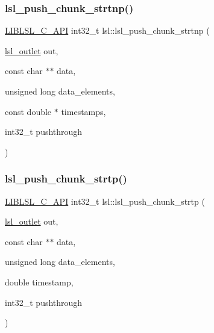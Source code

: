 \subsubsection{\texorpdfstring{lsl\+\_\+push\+\_\+chunk\+\_\+strtnp()}{lsl\_push\_chunk\_strtnp()}}
{\footnotesize\ttfamily \hyperlink{lsl__cpp_8h_aafd0ef1813e8be84a1420c4f1df64615}{L\+I\+B\+L\+S\+L\+\_\+\+C\+\_\+\+A\+PI} int32\+\_\+t lsl\+::lsl\+\_\+push\+\_\+chunk\+\_\+strtnp (\begin{DoxyParamCaption}\item[{\hyperlink{namespacelsl_abcf512b0f66dacf86c10b165995fd50b}{lsl\+\_\+outlet}}]{out,  }\item[{const char $\ast$$\ast$}]{data,  }\item[{unsigned long}]{data\+\_\+elements,  }\item[{const double $\ast$}]{timestamps,  }\item[{int32\+\_\+t}]{pushthrough }\end{DoxyParamCaption})}

\mbox{\label{namespacelsl_a9317d0fe8f576fb80e58e362a39e12e1}} 
\subsubsection{\texorpdfstring{lsl\+\_\+push\+\_\+chunk\+\_\+strtp()}{lsl\_push\_chunk\_strtp()}}
{\footnotesize\ttfamily \hyperlink{lsl__cpp_8h_aafd0ef1813e8be84a1420c4f1df64615}{L\+I\+B\+L\+S\+L\+\_\+\+C\+\_\+\+A\+PI} int32\+\_\+t lsl\+::lsl\+\_\+push\+\_\+chunk\+\_\+strtp (\begin{DoxyParamCaption}\item[{\hyperlink{namespacelsl_abcf512b0f66dacf86c10b165995fd50b}{lsl\+\_\+outlet}}]{out,  }\item[{const char $\ast$$\ast$}]{data,  }\item[{unsigned long}]{data\+\_\+elements,  }\item[{double}]{timestamp,  }\item[{int32\+\_\+t}]{pushthrough }\end{DoxyParamCaption})}

\mbox{\label{namespacelsl_a77dbefbfa9fc565f9ead1db3574ef001}} 
